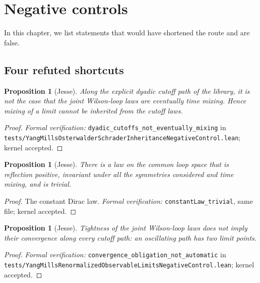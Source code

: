 \documentclass[11pt]{article}
\numberwithin{equation}{subsection}
\theoremstyle{plain}
\newtheorem{proposition}[theorem]{Proposition}
\theoremstyle{definition}
\begin{document}
\section{Negative controls}\label{sec:controls}

In this chapter, we list statements that would have shortened the route and are false.

\subsection{Four refuted shortcuts}

\begin{proposition}[Jesse]\label{prop:mix}
Along the explicit dyadic cutoff path of the library, it is not the case that the joint
Wilson-loop laws are eventually time mixing. Hence mixing of a limit cannot be inherited from
the cutoff laws.
\end{proposition}
\begin{proof}
\emph{Formal verification:} \texttt{dyadic\_\allowbreak{}cutoffs\_\allowbreak{}not\_\allowbreak{}eventually\_\allowbreak{}mixing} in
\texttt{tests/\allowbreak{}Yang\allowbreak{}Mills\allowbreak{}Osterwalder\allowbreak{}Schrader\allowbreak{}Inheritance\allowbreak{}Negative\allowbreak{}Control.\allowbreak{}lean}; kernel accepted.
\end{proof}

\begin{proposition}[Jesse]\label{prop:trivial}
There is a law on the common loop space that is reflection positive, invariant under all the
symmetries considered and time mixing, and is trivial.
\end{proposition}
\begin{proof}
The constant Dirac law. \emph{Formal verification:} \texttt{constant\allowbreak{}Law\_\allowbreak{}trivial}, same file;
kernel accepted.
\end{proof}

\begin{proposition}[Jesse]\label{prop:conv}
Tightness of the joint Wilson-loop laws does not imply their convergence along every cutoff
path: an oscillating path has two limit points.
\end{proposition}
\begin{proof}
\emph{Formal verification:} \texttt{convergence\_\allowbreak{}obligation\_\allowbreak{}not\_\allowbreak{}automatic} in
\texttt{tests/\allowbreak{}Yang\allowbreak{}Mills\allowbreak{}Renormalized\allowbreak{}Observable\allowbreak{}Limits\allowbreak{}Negative\allowbreak{}Control.\allowbreak{}lean}; kernel accepted.
\end{proof}
\end{document}
